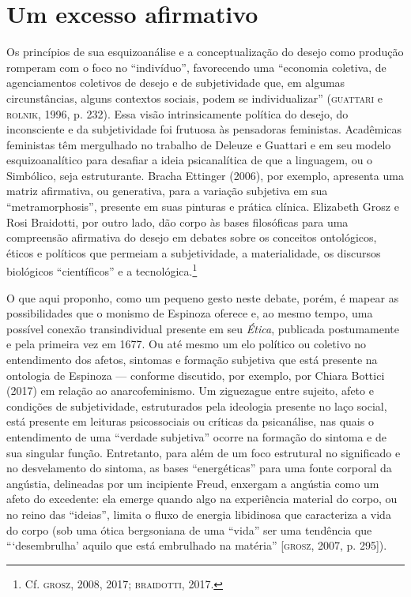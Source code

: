\section{Um excesso afirmativo}

Os princípios de sua esquizoanálise e a conceptualização do desejo como
produção romperam com o foco no ``indivíduo'', favorecendo uma
``economia coletiva, de agenciamentos coletivos de desejo e de
subjetividade que, em algumas circunstâncias, alguns contextos sociais,
podem se individualizar'' (\textsc{guattari} e \textsc{rolnik}, 1996, p. 232). Essa visão
intrinsicamente política do desejo, do inconsciente e da subjetividade
foi frutuosa às pensadoras feministas. Acadêmicas feministas têm
mergulhado no trabalho de Deleuze e Guattari e em seu modelo
esquizoanalítico para desafiar a ideia psicanalítica de que a linguagem,
ou o Simbólico, seja estruturante. Bracha Ettinger (2006), por exemplo,
apresenta uma matriz afirmativa, ou generativa, para a variação
subjetiva em sua ``metramorphosis'', presente em suas
pinturas e prática clínica. Elizabeth Grosz e Rosi Braidotti, por outro
lado, dão corpo às bases filosóficas para uma compreensão afirmativa do
desejo em debates sobre os conceitos ontológicos, éticos e políticos que
permeiam a subjetividade, a materialidade, os discursos biológicos
``científicos'' e a tecnológica.\footnote{Cf. \textsc{grosz}, 2008, 2017; \textsc{braidotti},
2017.}

O que aqui proponho, como um pequeno gesto neste debate, porém, é mapear
as possibilidades que o monismo de Espinoza oferece e, ao mesmo tempo,
uma possível conexão transindividual presente em seu \emph{Ética},
publicada postumamente e pela primeira vez em 1677. Ou até mesmo um elo
político ou coletivo no entendimento dos afetos, sintomas e formação
subjetiva que está presente na ontologia de Espinoza --- conforme
discutido, por exemplo, por Chiara Bottici (2017) em relação ao
anarcofeminismo. Um ziguezague entre sujeito, afeto e condições de
subjetividade, estruturados pela ideologia presente no laço social, está
presente em leituras psicossociais ou críticas da psicanálise, nas quais
o entendimento de uma ``verdade subjetiva'' ocorre na formação do
sintoma e de sua singular função. Entretanto, para além de um foco
estrutural no significado e no desvelamento do sintoma, as bases
``energéticas'' para uma fonte corporal da angústia, delineadas por um
incipiente Freud, enxergam a angústia como um afeto do excedente: ela
emerge quando algo na experiência material do corpo, ou no reino das
``ideias'', limita o fluxo de energia libidinosa que caracteriza a vida
do corpo (sob uma ótica bergsoniana de uma ``vida'' ser uma tendência
que ```desembrulha' aquilo que está embrulhado na matéria'' {[}\textsc{grosz},
2007, p. 295{]}).

